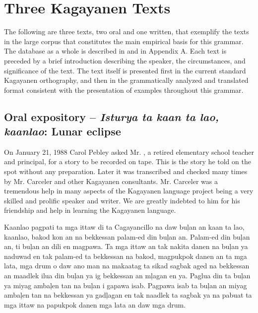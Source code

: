 \chapter{Three Kagayanen Texts}\label{app:b}
\label{chap:threekagayanentexts}

The following are three texts, two oral and one written, that exemplify the texts in the large corpus that constitutes the main empirical basis for this grammar. The database as a whole is described in  and in Appendix A. Each text is preceded by a brief introduction describing the speaker, the circumstances, and significance of the text. The text itself is presented first in the current standard Kagayanen orthography, and then in the grammatically analyzed and translated format consistent with the presentation of examples throughout this grammar.

\section{Oral expository -- \textit{Isturya ta kaan ta lao, kaanlao}: Lunar eclipse}

On January 21, 1988 Carol Pebley asked Mr. , a retired elementary school teacher and principal, for a story to be recorded on tape. This is the story he told on the spot without any preparation. Later it was transcribed and checked many times by Mr. Carceler and other Kagayanen consultants. Mr. Carceler was a tremendous help in many aspects of the Kagayanen language project being a very skilled and prolific speaker and writer. We are greatly indebted to him for his friendship and help in learning the Kagayanen language.


Kaanlao pagpati ta mga ittaw di ta Cagayancillo na daw bu\c{l}an an kaan ta lao, kaanlao, bakod kon an na bekkessan palam-ed din bu\c{l}an an. Palam-ed din bu\c{l}an an, ti bu\c{l}an an dili en magpawa. Ta mga ittaw an tak nakita danen na bu\c{l}an ya naduwad en tak palam-ed ta bekkessan na bakod, magpukpok danen an ta mga lata, mga drum o daw ano man na makaatag ta sikad sagbak aged na bekkessan an maadlek ilua din bu\c{l}an ya ig bekkessan an m\c{l}agan en ya. Paglua din ta bu\c{l}an ya miyag amba\c{l}en tan na bu\c{l}an i gapawa isab. Pagpawa isab ta bu\c{l}an an miyag amba\c{l}en tan na bekkessan ya gad\c{l}agan en tak naadlek ta sagbak ya na pabuat ta mga ittaw na papukpok danen mga lata an daw mga drum.

